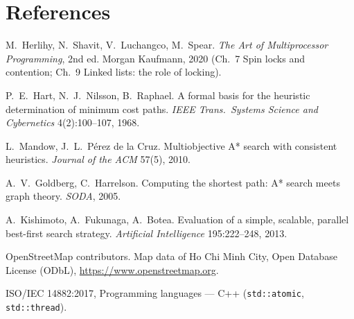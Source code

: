 \section*{References}
{\raggedright
\begin{enumerate}[label={[\arabic*]},nosep,leftmargin=*]
  \item \label{ref:herlihy} M.~Herlihy, N.~Shavit, V.~Luchangco, M.~Spear.
        \emph{The Art of Multiprocessor Programming}, 2nd ed. Morgan Kaufmann,
        2020 (Ch.~7 Spin locks and contention; Ch.~9 Linked lists: the role of
        locking).
  \item P.~E.~Hart, N.~J.~Nilsson, B.~Raphael. A formal basis for the
        heuristic determination of minimum cost paths. \emph{IEEE Trans.\
        Systems Science and Cybernetics} 4(2):100--107, 1968.
  \item \label{ref:mandow} L.~Mandow, J.~L.~P\'erez de la Cruz.
        Multiobjective A* search with consistent heuristics. \emph{Journal of
        the ACM} 57(5), 2010.
  \item \label{ref:goldberg} A.~V.~Goldberg, C.~Harrelson. Computing the
        shortest path: A* search meets graph theory. \emph{SODA}, 2005.
  \item \label{ref:kishimoto} A.~Kishimoto, A.~Fukunaga, A.~Botea.
        Evaluation of a simple, scalable, parallel best-first search strategy.
        \emph{Artificial Intelligence} 195:222--248, 2013.
  \item OpenStreetMap contributors. Map data of Ho Chi Minh City, Open
        Database License (ODbL), \url{https://www.openstreetmap.org}.
  \item ISO/IEC 14882:2017, Programming languages --- C++
        (\texttt{std::atomic}, \texttt{std::thread}).
\end{enumerate}
}
